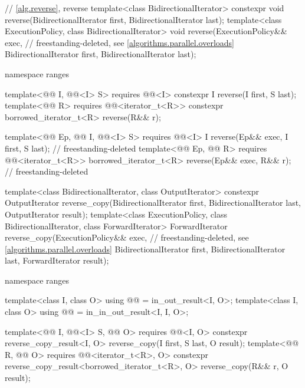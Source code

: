 \begin{codeblock}
{  // \ref{alg.reverse}, reverse
  template<class BidirectionalIterator>
    constexpr void reverse(BidirectionalIterator first, BidirectionalIterator last);
  template<class ExecutionPolicy, class BidirectionalIterator>
    void reverse(ExecutionPolicy&& exec,                        // freestanding-deleted, see \ref{algorithms.parallel.overloads}
                 BidirectionalIterator first, BidirectionalIterator last);

  namespace ranges {
    template<@@ I, @@<I> S>
      requires @@<I>
      constexpr I reverse(I first, S last);
    template<@@ R>
      requires @@<iterator_t<R>>
      constexpr borrowed_iterator_t<R> reverse(R&& r);

    template<@@ Ep, @@ I, @@<I> S>
      requires @@<I>
      I reverse(Ep&& exec, I first, S last);                    // freestanding-deleted
    template<@@ Ep, @@ R>
      requires @@<iterator_t<R>>
      borrowed_iterator_t<R> reverse(Ep&& exec, R&& r);         // freestanding-deleted
  }

  template<class BidirectionalIterator, class OutputIterator>
    constexpr OutputIterator
      reverse_copy(BidirectionalIterator first, BidirectionalIterator last,
                   OutputIterator result);
  template<class ExecutionPolicy, class BidirectionalIterator, class ForwardIterator>
    ForwardIterator
      reverse_copy(ExecutionPolicy&& exec,                      // freestanding-deleted, see \ref{algorithms.parallel.overloads}
                   BidirectionalIterator first, BidirectionalIterator last,
                   ForwardIterator result);

  namespace ranges {
    template<class I, class O>
      using @@ = in_out_result<I, O>;
    template<class I, class O>
      using @@ = in_in_out_result<I, I, O>;

    template<@@ I, @@<I> S, @@ O>
      requires @@<I, O>
      constexpr reverse_copy_result<I, O>
        reverse_copy(I first, S last, O result);
    template<@@ R, @@ O>
      requires @@<iterator_t<R>, O>
      constexpr reverse_copy_result<borrowed_iterator_t<R>, O>
        reverse_copy(R&& r, O result);

}}
\end{codeblock}
